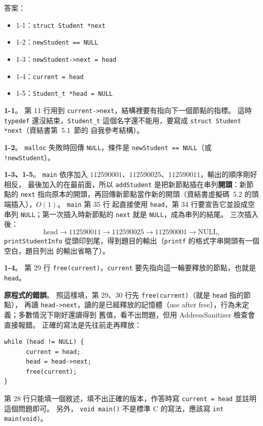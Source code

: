 \begin{pastsoln}
答案：
\begin{itemize}
\item 1-1：\texttt{struct Student *next}
\item 1-2：\texttt{newStudent == NULL}
\item 1-3：\texttt{newStudent->next = head}
\item 1-4：\texttt{current = head}
\item 1-5：\texttt{Student\_t *head = NULL}
\end{itemize}

\textbf{1-1}。 第 11 行用到 \texttt{current->next}，結構裡要有指向下一個節點的指標。 這時 \texttt{typedef}
還沒結束，\texttt{Student\_t} 這個名字還不能用，要寫成 \texttt{struct Student *next}（資結書第~5.1~節的
自我參考結構）。

\textbf{1-2}。 \texttt{malloc} 失敗時回傳 \texttt{NULL}，條件是 \texttt{newStudent == NULL}（或
\texttt{!newStudent}）。

\textbf{1-3、1-5}。 \texttt{main} 依序加入 $112590001$、$112590025$、$112590011$，輸出的順序剛好相反，
最後加入的在最前面，所以 \texttt{addStudent} 是把新節點插在串列\textbf{開頭}：新節點的 \texttt{next}
指向原本的開頭，再回傳新節點當作新的開頭（資結書虛擬碼~5.2 的頭端插入），$O(1)$。 \texttt{main} 第 35 行
起直接使用 \texttt{head}，第 34 行要宣告它並設成空串列 \texttt{NULL}；第一次插入時新節點的 \texttt{next}
就是 \texttt{NULL}，成為串列的結尾。 三次插入後：
\[
\text{head} \to 112590011 \to 112590025 \to 112590001 \to \text{NULL},
\]
\texttt{printStudentInfo} 從頭印到尾，得到題目的輸出（\texttt{printf} 的格式字串開頭有一個空白，題目列出
的輸出省略了）。

\textbf{1-4}。 第 29 行 \texttt{free(current)}，\texttt{current} 要先指向這一輪要釋放的節點，也就是
\texttt{head}。

\textbf{原程式的錯誤}。 照這樣填，第 29、30 行先 \texttt{free(current)}（就是 \texttt{head} 指的節點），
再讀 \texttt{head->next}，讀的是已經釋放的記憶體（use after free），行為未定義；多數情況下剛好還讀得到
舊值，看不出問題，但用 AddressSanitizer 檢查會直接報錯。 正確的寫法是先往前走再釋放：
\begin{verbatim}
while (head != NULL) {
      current = head;
      head = head->next;
      free(current);
}
\end{verbatim}
第 28 行只能填一個敘述，填不出正確的版本，作答時寫 \texttt{current = head} 並註明這個問題即可。 另外，
\texttt{void main()} 不是標準 C 的寫法，應該寫 \texttt{int main(void)}。
\end{pastsoln}
